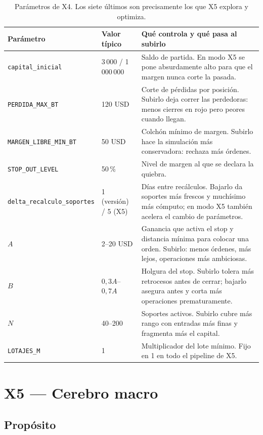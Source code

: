 \documentclass[11pt,a4paper]{article}
\newcommand{\code}[1]{\texttt{\small #1}}
\begin{document}
\begin{table}[h]
\centering
\small
\begin{tabularx}{\linewidth}{@{}l l X@{}}
\toprule
\textbf{Parámetro} & \textbf{Valor típico} & \textbf{Qué controla y qué pasa al subirlo} \\
\midrule
\code{capital_inicial} & 3\,000 / 1\,000\,000 & Saldo de partida. En modo X5 se pone absurdamente alto para que el margen nunca corte la pasada. \\
\code{PERDIDA_MAX_BT} & 120 USD & Corte de pérdidas por posición. Subirlo deja correr las perdedoras: menos cierres en rojo pero peores cuando llegan. \\
\code{MARGEN_LIBRE_MIN_BT} & 50 USD & Colchón mínimo de margen. Subirlo hace la simulación más conservadora: rechaza más órdenes. \\
\code{STOP_OUT_LEVEL} & 50\,\% & Nivel de margen al que se declara la quiebra. \\
\code{delta_recalculo_soportes} & 1 (versión) / 5 (X5) & Días entre recálculos. Bajarlo da soportes más frescos y muchísimo más cómputo; en modo X5 también acelera el cambio de parámetros. \\
$A$ & 2--20 USD & Ganancia que activa el stop y distancia mínima para colocar una orden. Subirlo: menos órdenes, más lejos, operaciones más ambiciosas. \\
$B$ & $0{,}3A$--$0{,}7A$ & Holgura del stop. Subirlo tolera más retrocesos antes de cerrar; bajarlo asegura antes y corta más operaciones prematuramente. \\
$N$ & 40--200 & Soportes activos. Subirlo cubre más rango con entradas más finas y fragmenta más el capital. \\
\code{LOTAJES_M} & 1 & Multiplicador del lote mínimo. Fijo en 1 en todo el pipeline de X5. \\
\bottomrule
\end{tabularx}
\caption{Parámetros de X4. Los siete últimos son precisamente los que X5 explora y optimiza.}
\end{table}

\newpage
\section{X5 — Cerebro macro}
\label{sec:x5}

\subsection{Propósito}
\end{document}
